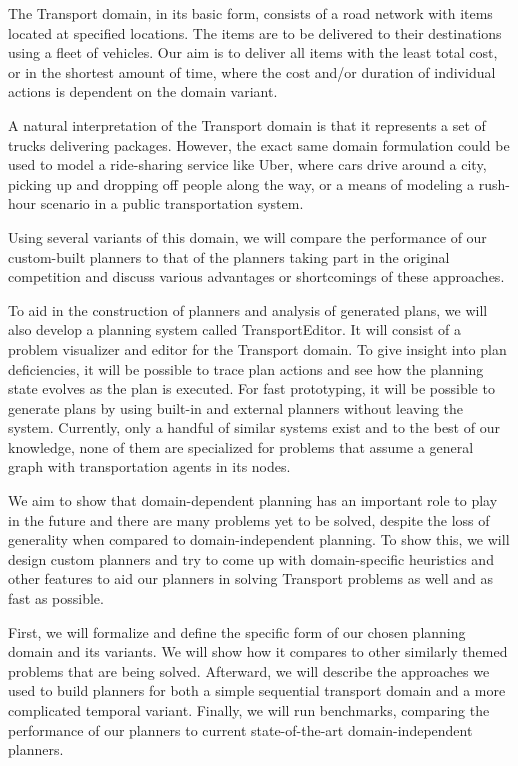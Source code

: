 The Transport domain, in its basic form, consists of a road network with items located at specified locations. The items are to be delivered to their destinations
using a fleet of vehicles. Our aim is to deliver all items
with the least total cost, or in the shortest amount of time,
where the cost and/or duration of individual actions is dependent on the domain variant.

A natural interpretation of the Transport domain is that it represents a set of trucks
delivering packages. However,
the exact same domain formulation could be used to
model a ride-sharing service like Uber, where cars drive around a city, picking up and dropping off people along the way, or
a means of modeling a rush-hour scenario in a public transportation system.

Using several variants
of this domain, we will compare the performance of our custom-built planners to that of the planners taking part in the original competition and discuss various advantages or shortcomings of these approaches.

To aid in the construction of planners and analysis of generated
plans, we will also develop a planning system called TransportEditor. It will consist of a problem visualizer and editor for the Transport domain. To give insight into plan deficiencies, it will be possible to trace plan actions and see how the planning
state evolves as the plan is executed. For fast prototyping,
it will be possible to generate plans by using built-in and external planners without leaving the system. Currently, only a handful of similar systems exist and to the best of our knowledge, none of them are specialized for problems that assume a general graph with transportation agents in its nodes.

We aim to show that domain-dependent planning has an important
role to play in the future and there are many problems yet to be solved,
despite the loss of generality when compared to domain-independent planning.
To show this, we will design custom planners
and try to come up with domain-specific heuristics and other features
to aid our planners in solving Transport problems as well and as fast as
possible.

First, we will formalize and define the specific form of our
chosen planning domain and its variants. We will show how
it compares to other similarly themed problems that are being
solved. Afterward, we will describe the approaches we used
to build planners for both a
simple sequential transport domain and a more complicated
temporal variant. Finally, we will run benchmarks,
comparing the performance of our planners to current
state-of-the-art domain-independent planners.
